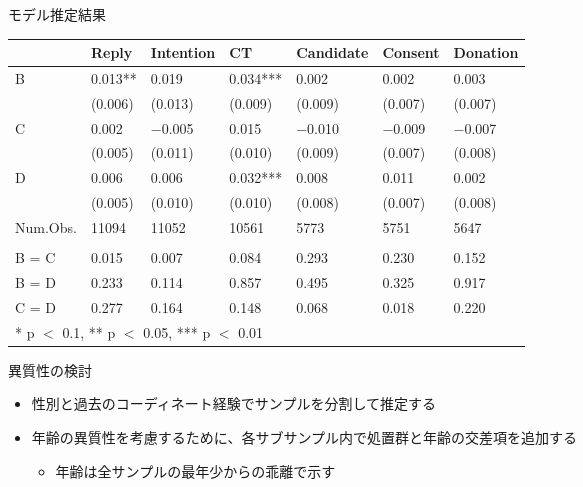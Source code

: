 \documentclass[
      aspectratio=169,
        12pt,
    ]{beamer}
\providecommand{\tightlist}{%
  \setlength{\itemsep}{0pt}\setlength{\parskip}{0pt}}
\begin{document}
\begin{frame}{モデル推定結果}
\protect\hypertarget{ux30e2ux30c7ux30ebux63a8ux5b9aux7d50ux679c}{}
\begin{table}
\centering
\fontsize{9}{11}\selectfont
\begin{tabular}[t]{l>{\centering\arraybackslash}p{5em}>{\centering\arraybackslash}p{5em}>{\centering\arraybackslash}p{5em}>{\centering\arraybackslash}p{5em}>{\centering\arraybackslash}p{5em}>{\centering\arraybackslash}p{5em}}
\toprule
  & Reply & Intention & CT & Candidate & Consent & Donation\\
\midrule
B & \num{0.013}** & \num{0.019} & \num{0.034}*** & \num{0.002} & \num{0.002} & \num{0.003}\\
 & (\num{0.006}) & (\num{0.013}) & (\num{0.009}) & (\num{0.009}) & (\num{0.007}) & (\num{0.007})\\
C & \num{0.002} & \num{-0.005} & \num{0.015} & \num{-0.010} & \num{-0.009} & \num{-0.007}\\
 & (\num{0.005}) & (\num{0.011}) & (\num{0.010}) & (\num{0.009}) & (\num{0.007}) & (\num{0.008})\\
D & \num{0.006} & \num{0.006} & \num{0.032}*** & \num{0.008} & \num{0.011} & \num{0.002}\\
 & (\num{0.005}) & (\num{0.010}) & (\num{0.010}) & (\num{0.008}) & (\num{0.007}) & (\num{0.008})\\
\midrule
Num.Obs. & \num{11094} & \num{11052} & \num{10561} & \num{5773} & \num{5751} & \num{5647}\\
\addlinespace[0.3em]
\multicolumn{7}{l}{\textit{F-tests, p-value}}\\
\hspace{1em}B = C & \num{0.015} & \num{0.007} & \num{0.084} & \num{0.293} & \num{0.230} & \num{0.152}\\
\hspace{1em}B = D & \num{0.233} & \num{0.114} & \num{0.857} & \num{0.495} & \num{0.325} & \num{0.917}\\
\hspace{1em}C = D & \num{0.277} & \num{0.164} & \num{0.148} & \num{0.068} & \num{0.018} & \num{0.220}\\
\bottomrule
\multicolumn{7}{l}{\rule{0pt}{1em}* p $<$ 0.1, ** p $<$ 0.05, *** p $<$ 0.01}\\
\end{tabular}
\end{table}
\end{frame}

\begin{frame}{異質性の検討}
\protect\hypertarget{ux7570ux8ceaux6027ux306eux691cux8a0e}{}
\begin{itemize}
\tightlist
\item
  性別と過去のコーディネート経験でサンプルを分割して推定する
\item
  年齢の異質性を考慮するために、各サブサンプル内で処置群と年齢の交差項を追加する

  \begin{itemize}
  \tightlist
  \item
    年齢は全サンプルの最年少からの乖離で示す
  \end{itemize}
\end{itemize}
\end{frame}
\end{document}
